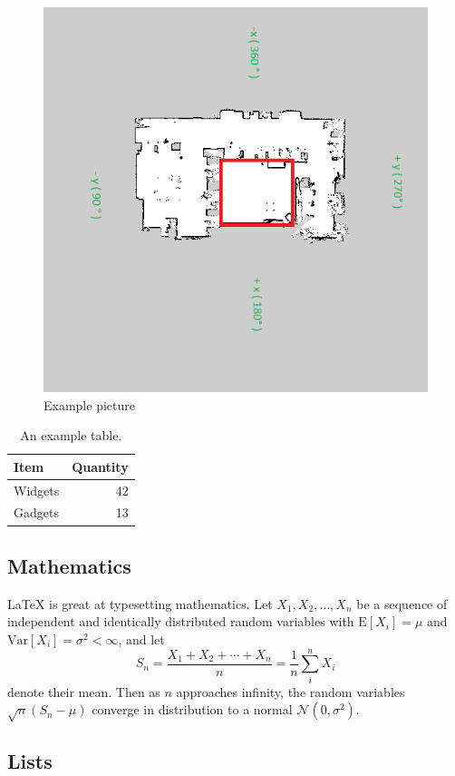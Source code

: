 \documentclass[12pt]{article}
\begin{document}
\begin{figure}%
\centering
\includegraphics[width=.9\linewidth]{pic/localization-map.png}
\caption{Example picture}
\label{fig:frog}
\end{figure}

\begin{table}
\centering
\begin{tabular}{l|r}
Item & Quantity \\\hline
Widgets & 42 \\
Gadgets & 13
\end{tabular}
\caption{\label{tab:widgets}An example table.}
\end{table}

\subsection{Mathematics}

\LaTeX{} is great at typesetting mathematics. Let $X_1, X_2, \ldots, X_n$ be a sequence of independent and identically distributed random variables with $\text{E}[X_i] = \mu$ and $\text{Var}[X_i] = \sigma^2 < \infty$, and let
$$S_n = \frac{X_1 + X_2 + \cdots + X_n}{n}
      = \frac{1}{n}\sum_{i}^{n} X_i$$
denote their mean. Then as $n$ approaches infinity, the random variables $\sqrt{n}(S_n - \mu)$ converge in distribution to a normal $\mathcal{N}(0, \sigma^2)$.

\subsection{Lists}
\end{document}

